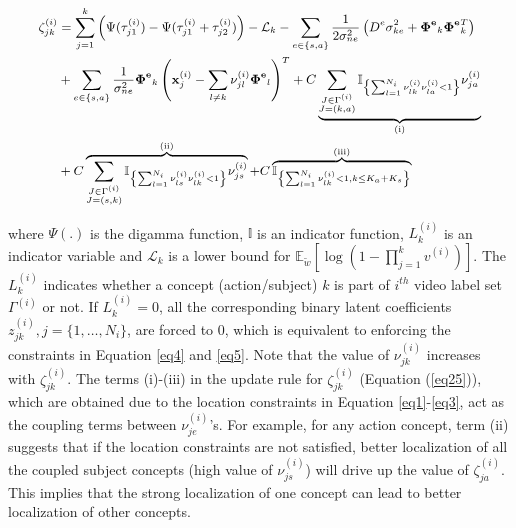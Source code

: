 \documentclass[runningheads]{llncs}
\begin{document}
\vspace{-4mm}
\begin{equation}
\small{
\begin{aligned}
 \label{eq25}
\zeta_{jk}^{(i)} &= \sum_{j=1}^k \left(\Psi(\tau_{j1}^{(i)}) - \Psi(\tau_{j1}^{(i)} + \tau_{j2}^{(i)})\right) - \mathcal{L}_k - \sum_{e\in\{s,a\}}\frac{1}{2\sigma_{ne}^2}\left(D^e\sigma_{ke}^2 + \mathbf{\Phi^e}_k\mathbf{\Phi^e}_k^T\right)  \\ 
&+ \sum_{e\in\{s,a\}} \frac{1}{\sigma_{ne}^2}  \mathbf{\Phi^e}_k\left(\mathbf{x}_j^{(i)} - \sum_{l\neq k} \nu_{jl}^{(i)}\mathbf{\Phi^e}_l\right)^T 
+ C\underbrace{\sum_{\substack{J\in \Gamma^{(i)} \\ J=(k,a)}} \mathbb{I}_{\left\lbrace\sum_{l=1}^{N_i}\nu_{lk}^{(i)}\nu_{la}^{(i)} < 1\right\rbrace} \nu_{ja}^{(i)}}_\text{(i)} \\
 &+ C\overbrace{\sum_{\substack{J\in \Gamma^{(i)} \\ J=(s,k)}} \mathbb{I}_{\left\lbrace\sum_{l=1}^{N_i}\nu_{ls}^{(i)}\nu_{lk}^{(i)} < 1\right\rbrace} \nu_{js}^{(i)}}^\text{(ii)} + C\overbrace{\mathbb{I}_{\left\lbrace\sum_{l=1}^{N_i}\nu_{lk}^{(i)} < 1, k \leq K_a + K_s\right\rbrace}}^\text{(iii)}
 \end{aligned}
 }
\end{equation}

\noindent
where $\Psi(.)$ is the digamma function, $\mathbb{I}$ is an indicator function, $L_k^{(i)}$  is an indicator variable and $\mathcal{L}_k $ is a lower bound for $\mathbb{E}_{\tilde{w}}[\log(1 - \prod_{j=1}^k v^{(i)})]$. The $L_k^{(i)}$ indicates whether a concept (action/subject) $k$ is part of $i^{th}$ video label set $\Gamma^{(i)}$ or not. If $L_k^{(i)} = 0$, all the corresponding binary latent coefficients $z_{jk}^{(i)}, j = \{1,\dots,N_i\}$, are forced to 0, which is equivalent to enforcing the constraints in Equation \eqref{eq4} and \eqref{eq5}. Note that the value of $\nu_{jk}^{(i)}$ increases with $\zeta_{jk}^{(i)}$. The terms (i)-(iii) in the update rule for $\zeta_{jk}^{(i)}$ (Equation (\ref{eq25})), which are obtained due to the location constraints in Equation \eqref{eq1}-\eqref{eq3}, act as the coupling terms between $\nu_{je}^{(i)}$'s. For example, for any action concept, term (ii) suggests that if the location constraints are not satisfied, better localization of all the coupled subject concepts (high value of $\nu_{js}^{(i)}$) will drive up the value of $\zeta_{ja}^{(i)}$. This implies that the strong localization of one concept can lead to better localization of other concepts.
\end{document}
